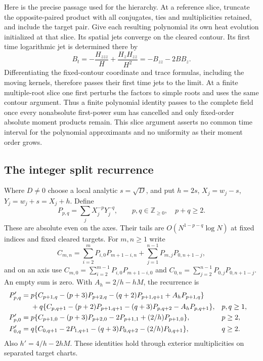 Here is the precise passage used for the hierarchy. At a reference
slice, truncate the opposite-paired product with all conjugates,
ties and multiplicities retained, and include the target pair. Give
each resulting polynomial its own heat evolution initialized at that
slice. Its spatial jets converge on the cleared contour. Its first
time logarithmic jet is determined there by
\begin{equation}
 B_t=-\frac{H_{zzz}}H+\frac{H_zH_{zz}}{H^2}
     =-B_{zz}-2BB_z.
 \label{agc:hier-Burgers}
\end{equation}
Differentiating the fixed-contour coordinate and trace formulas,
including the moving kernels, therefore passes their first time jets
to the limit. At a finite multiple-root slice one first perturbs the
factors to simple roots and uses the same contour argument. Thus a
finite polynomial identity passes to the complete field once every
nonabsolute first-power sum has cancelled and only fixed-order
absolute moment products remain. This slice argument asserts no
common time interval for the polynomial approximants and no
uniformity as their moment order grows.

\subsection{The integer split recurrence}

Where $D\ne0$ choose a local analytic $s=\sqrt D$, and put
$h=2s$, $X_j=w_j-s$, $Y_j=w_j+s=X_j+h$. Define
\begin{equation}
 P_{p,q}=\sum_jX_j^{-p}Y_j^{-q},\qquad
 p,q\in\mathbb Z_{\ge0},\quad p+q\ge2.
 \label{agc:hier-P}
\end{equation}
These are absolute even on the axes. Their tails are
$O(N^{1-p-q}\log N)$ at fixed indices and fixed cleared targets.
For $m,n\ge1$ write
\[
 C_{m,n}=\sum_{i=2}^{m}P_{i,0}P_{m+1-i,n}
          +\sum_{j=1}^{n-1}P_{m,j}P_{0,n+1-j},
\]
and on an axis use
$C_{m,0}=\sum_{i=2}^{m-1}P_{i,0}P_{m+1-i,0}$ and
$C_{0,n}=\sum_{j=2}^{n-1}P_{0,j}P_{0,n+1-j}$.
An empty sum is zero. With $A_h=2/h-hM$, the recurrence is
\begin{align}
 P_{p,q}'={}&p\{C_{p+1,q}-(p+3)P_{p+2,q}
                  -(q+2)P_{p+1,q+1}+A_hP_{p+1,q}\}\notag\\
 &+q\{C_{p,q+1}-(p+2)P_{p+1,q+1}
                  -(q+3)P_{p,q+2}-A_hP_{p,q+1}\},
          &&p,q\ge1, \label{agc:hier-mixed}\\
 P_{p,0}'={}&p\{C_{p+1,0}-(p+3)P_{p+2,0}-2P_{p+1,1}
                                     +(2/h)P_{p+1,0}\},
          &&p\ge2, \label{agc:hier-axis-one}\\
 P_{0,q}'={}&q\{C_{0,q+1}-2P_{1,q+1}-(q+3)P_{0,q+2}
                                     -(2/h)P_{0,q+1}\},
          &&q\ge2. \label{agc:hier-axis-two}
\end{align}
Also $h'=4/h-2hM$. These identities hold through exterior
multiplicities on separated target charts.

